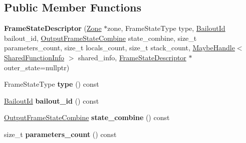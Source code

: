 \subsection*{Public Member Functions}
\begin{DoxyCompactItemize}
\item 
{\bfseries Frame\+State\+Descriptor} (\hyperlink{classv8_1_1internal_1_1_zone}{Zone} $\ast$zone, Frame\+State\+Type type, \hyperlink{classv8_1_1internal_1_1_bailout_id}{Bailout\+Id} bailout\+\_\+id, \hyperlink{classv8_1_1internal_1_1compiler_1_1_output_frame_state_combine}{Output\+Frame\+State\+Combine} state\+\_\+combine, size\+\_\+t parameters\+\_\+count, size\+\_\+t locals\+\_\+count, size\+\_\+t stack\+\_\+count, \hyperlink{classv8_1_1internal_1_1_maybe_handle}{Maybe\+Handle}$<$ \hyperlink{classv8_1_1internal_1_1_shared_function_info}{Shared\+Function\+Info} $>$ shared\+\_\+info, \hyperlink{classv8_1_1internal_1_1compiler_1_1_frame_state_descriptor}{Frame\+State\+Descriptor} $\ast$outer\+\_\+state=nullptr)\hypertarget{classv8_1_1internal_1_1compiler_1_1_frame_state_descriptor_a16d526494c530deca2c444c130670176}{}\label{classv8_1_1internal_1_1compiler_1_1_frame_state_descriptor_a16d526494c530deca2c444c130670176}

\item 
Frame\+State\+Type {\bfseries type} () const \hypertarget{classv8_1_1internal_1_1compiler_1_1_frame_state_descriptor_a7d90dc1701d9e63a70e5b960a481065a}{}\label{classv8_1_1internal_1_1compiler_1_1_frame_state_descriptor_a7d90dc1701d9e63a70e5b960a481065a}

\item 
\hyperlink{classv8_1_1internal_1_1_bailout_id}{Bailout\+Id} {\bfseries bailout\+\_\+id} () const \hypertarget{classv8_1_1internal_1_1compiler_1_1_frame_state_descriptor_aa4f27a81665dcd6faebfd09557095090}{}\label{classv8_1_1internal_1_1compiler_1_1_frame_state_descriptor_aa4f27a81665dcd6faebfd09557095090}

\item 
\hyperlink{classv8_1_1internal_1_1compiler_1_1_output_frame_state_combine}{Output\+Frame\+State\+Combine} {\bfseries state\+\_\+combine} () const \hypertarget{classv8_1_1internal_1_1compiler_1_1_frame_state_descriptor_a4f0bf0b56f34156115325c5dfa349a12}{}\label{classv8_1_1internal_1_1compiler_1_1_frame_state_descriptor_a4f0bf0b56f34156115325c5dfa349a12}

\item 
size\+\_\+t {\bfseries parameters\+\_\+count} () const \hypertarget{classv8_1_1internal_1_1compiler_1_1_frame_state_descriptor_ab10dd8077ab1b8344cbdabcc2000ccf2}{}\label{classv8_1_1internal_1_1compiler_1_1_frame_state_descriptor_ab10dd8077ab1b8344cbdabcc2000ccf2}


\end{DoxyCompactItemize}
